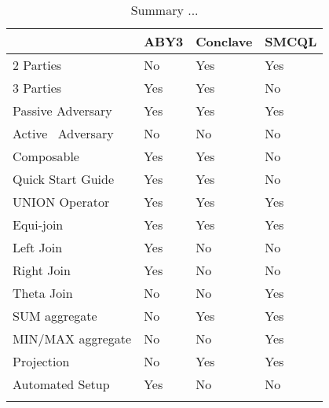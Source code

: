 \label{Summary}	
\begin{table}
	\centering
	\caption{Summary ...}
	\begin{tabular}{|l|l|l|l|} 
		\hline
		& ABY3                 & Conclave             & SMCQL                 \\ 
		\hline
		2 Parties            & No                   & Yes                  & Yes                   \\ 
		\hline
		3 Parties            & Yes                  & Yes                  & No                    \\ 
		\hline
		Passive Adversary    & Yes                  & Yes                  & Yes                   \\ 
		\hline
		Active~ Adversary    & No                   & No                   & No                    \\ 
		\hline
		Composable           & Yes                  & Yes                  & No                    \\ 
		\hline
		Quick Start Guide    & Yes                  & Yes                  & No                    \\ 
		\hline
		UNION Operator       & Yes                  & Yes                  & Yes                   \\ 
		\hline
		Equi-join            & Yes                  & Yes                  & Yes                   \\ 
		\hline
		Left Join            & Yes                  & No                   & No                    \\ 
		\hline
		Right Join           & Yes                  & No                   & No                    \\ 
		\hline
		Theta Join           & No                   & No                   & Yes                   \\ 
		\hline
		SUM aggregate        & No                   & Yes                  & Yes                   \\ 
		\hline
		MIN/MAX aggregate    & No                   & No                   & Yes                   \\ 
		\hline
		Projection           & No                   & Yes                  & Yes                   \\ 
		\hline
		Automated Setup           & Yes                   & No                  & No                   \\ 
		\hline
		
		\multicolumn{1}{l}{} & \multicolumn{1}{l}{} & \multicolumn{1}{l}{} & \multicolumn{1}{l}{} 
	\end{tabular}
\end{table}

